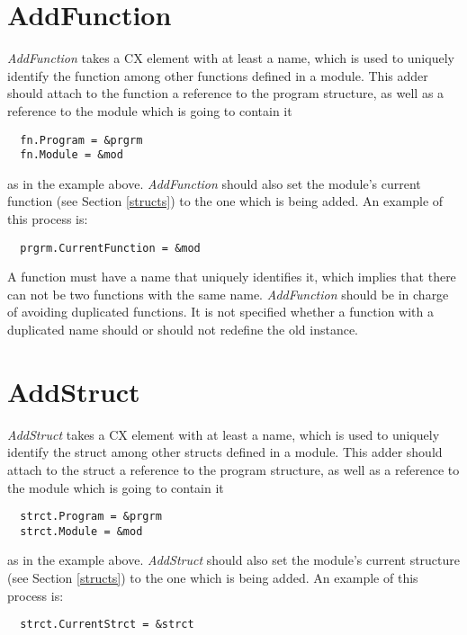 \section{AddFunction}
\label{addfunction}

\textit{AddFunction} takes a CX element with at least a name, which is used to
uniquely identify the function among other functions defined in a module. This
adder should attach to the function a reference to the program structure, as
well as a reference to the module which is going to contain it

\begin{lstlisting}
  fn.Program = &prgrm
  fn.Module = &mod
\end{lstlisting}

as in the example above. \textit{AddFunction} should also set the module's
current function (see Section \ref{structs}) to the one which is being added. An
example of this process is:

\begin{lstlisting}
  prgrm.CurrentFunction = &mod
\end{lstlisting}

A function must have a name that uniquely identifies it, which implies that
there can not be two functions with the same name. \textit{AddFunction} should
be in charge of avoiding duplicated functions. It is not specified whether a
function with a duplicated name should or should not redefine the old instance.

\section{AddStruct}
\label{addstruct}

\textit{AddStruct} takes a CX element with at least a name, which is used to
uniquely identify the struct among other structs defined in a module. This adder
should attach to the struct a reference to the program structure, as well as a
reference to the module which is going to contain it

\begin{lstlisting}
  strct.Program = &prgrm
  strct.Module = &mod
\end{lstlisting}

as in the example above. \textit{AddStruct} should also set the module's current
structure (see Section \ref{structs}) to the one which is being added. An
example of this process is:

\begin{lstlisting}
  strct.CurrentStrct = &strct
\end{lstlisting}

